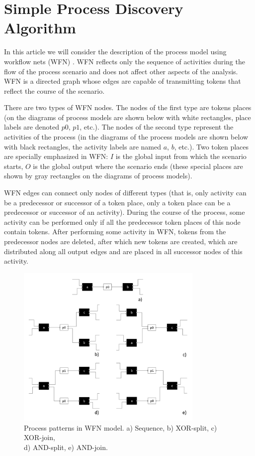 \documentclass[
11pt,%
tightenlines,%
twoside,%
onecolumn,%
nofloats,%
nobibnotes,%
nofootinbib,%
superscriptaddress,%
noshowpacs,%
centertags]%
{revtex4}
\begin{document}
\section{Simple Process Discovery Algorithm}

In this article we will consider the description of the process model using workflow nets (WFN) \cite{WorkflowNets}.
WFN reflects only the sequence of activities during the flow of the process scenario and does not affect other aspects of the analysis.
WFN is a directed graph whose edges are capable of transmitting tokens that reflect the course of the scenario.

There are two types of WFN nodes.
The nodes of the first type are tokens places (on the diagrams of process models are shown below with white rectangles, place labels are denoted $p0$, $p1$, etc.).
The nodes of the second type represent the activities of the process (in the diagrams of the process models are shown below with black rectangles, the activity labels are named $a$, $b$, etc.).
Two token places are specially emphasized in WFN: $I$ is the global input from which the scenario starts, $O$ is the global output where the scenario ends (these special places are shown by gray rectangles on the diagrams of process models).

WFN edges can connect only nodes of different types (that is, only activity can be a predecessor or successor of a token place, only a token place can be a predecessor or successor of an activity).
During the course of the process, some activity can be performed only if all the predecessor token places of this node contain tokens.
After performing some activity in WFN, tokens from the predecessor nodes are deleted, after which new tokens are created, which are distributed along all output edges and are placed in all successor nodes of this activity.

\begin{figure}[h]
\setcaptionmargin{5mm}
\onelinecaptionsfalse %
\includegraphics[width=0.8\textwidth]{pics/wfn-patterns.pdf}
\caption{Process patterns in WFN model. a) Sequence, b) XOR-split, c) XOR-join,\\d) AND-split, e) AND-join.}
\label{fig:wfn-patterns}
\end{figure}
\end{document}
